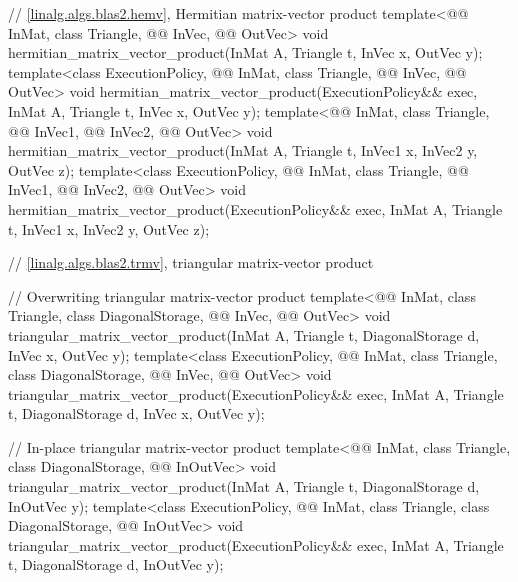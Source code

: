 \begin{codeblock}
{  // \ref{linalg.algs.blas2.hemv}, Hermitian matrix-vector product
  template<@@ InMat, class Triangle, @@ InVec, @@ OutVec>
    void hermitian_matrix_vector_product(InMat A, Triangle t, InVec x, OutVec y);
  template<class ExecutionPolicy,
           @@ InMat, class Triangle, @@ InVec, @@ OutVec>
    void hermitian_matrix_vector_product(ExecutionPolicy&& exec,
                                         InMat A, Triangle t, InVec x, OutVec y);
  template<@@ InMat, class Triangle, @@ InVec1, @@ InVec2,
           @@ OutVec>
    void hermitian_matrix_vector_product(InMat A, Triangle t, InVec1 x, InVec2 y, OutVec z);
  template<class ExecutionPolicy,
           @@ InMat, class Triangle, @@ InVec1, @@ InVec2,
           @@ OutVec>
    void hermitian_matrix_vector_product(ExecutionPolicy&& exec,
                                         InMat A, Triangle t, InVec1 x, InVec2 y, OutVec z);

  // \ref{linalg.algs.blas2.trmv}, triangular matrix-vector product

  // Overwriting triangular matrix-vector product
  template<@@ InMat, class Triangle, class DiagonalStorage, @@ InVec,
           @@ OutVec>
    void triangular_matrix_vector_product(InMat A, Triangle t, DiagonalStorage d, InVec x,
                                          OutVec y);
  template<class ExecutionPolicy,
           @@ InMat, class Triangle, class DiagonalStorage, @@ InVec,
           @@ OutVec>
    void triangular_matrix_vector_product(ExecutionPolicy&& exec,
                                          InMat A, Triangle t, DiagonalStorage d, InVec x,
                                          OutVec y);

  // In-place triangular matrix-vector product
  template<@@ InMat, class Triangle, class DiagonalStorage, @@ InOutVec>
    void triangular_matrix_vector_product(InMat A, Triangle t, DiagonalStorage d, InOutVec y);
  template<class ExecutionPolicy,
           @@ InMat, class Triangle, class DiagonalStorage, @@ InOutVec>
    void triangular_matrix_vector_product(ExecutionPolicy&& exec,
                                          InMat A, Triangle t, DiagonalStorage d, InOutVec y);

}
\end{codeblock}
